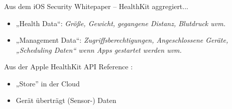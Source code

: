 \begin{frame}
    \frametitle{\insertsubsection}
    Aus dem iOS Security Whitepaper \cite{iosSecurity} -- HealthKit aggregiert...
    \vspace{.8em}
    \begin{itemize}
        \setlength\itemsep{0.6em}
        \item „Health Data“: \emph{Größe, Gewicht, gegangene Distanz, Blutdruck uvm.}
        \item „Management Data“: \emph{Zugriffsberechtigungen, Angeschlossene Geräte, „Scheduling Daten“ wenn Apps gestartet werden uvm.}
    \end{itemize}
    \vspace{.8em}
    Aus der Apple HealthKit API Reference \cite{hkApi}:
    \vspace{.8em}
    \begin{itemize}
        \setlength\itemsep{0.6em}
        \item „Store” in der Cloud
        \item Gerät überträgt (Sensor-) Daten
    \end{itemize}
\end{frame}

